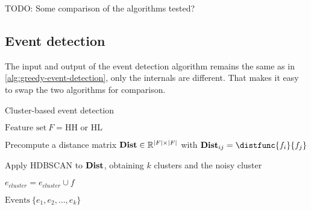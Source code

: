 {\color{blue} TODO: Some comparison of the algorithms tested?}


\subsection{Event detection}
The input and output of the event detection algorithm remains the same as in \ref{alg:greedy-event-detection}, only the internals are different. That makes it easy to swap the two algorithms for comparison.

\begin{algorithm}[H]
\begin{algorithmic}[1]
\caption{Cluster-based event detection}
\Input $\text{Feature set} ~ F = \text{HH or HL}$

\State Precompute a distance matrix $\mathbf{Dist} \in \mathbb{R}^{\left\vert F \right\vert \times \left\vert F \right\vert}$ with $\distmat_{ij} = \distfunc{f_{i}}{f_{j}}$

\State Apply HDBSCAN to $\mathbf{Dist}$, obtaining $k$ clusters and the noisy cluster

		\State $e_{cluster} = e_{cluster} \cup f$
	\EndIf
\EndFor

\Output $\text{Events} ~ \{ e_{1}, e_{2}, \dots, e_{k} \}$
\end{algorithmic}
\end{algorithm}
